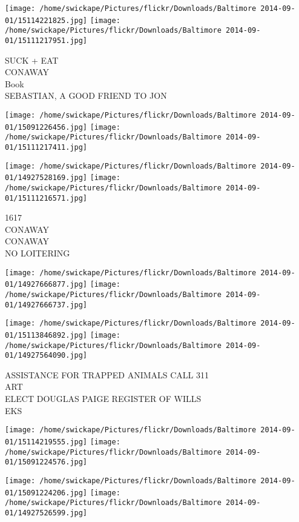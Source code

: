 \documentclass[10pt,letterpaper]{article}
\begin{document}
\texttt{[image: /home/swickape/Pictures/flickr/Downloads/Baltimore 2014-09-01/15114221825.jpg]}
\texttt{[image: /home/swickape/Pictures/flickr/Downloads/Baltimore 2014-09-01/15111217951.jpg]}

SUCK + EAT\\
CONAWAY\\
Book\\
SEBASTIAN, A GOOD FRIEND TO JON\\
\pagebreak

\texttt{[image: /home/swickape/Pictures/flickr/Downloads/Baltimore 2014-09-01/15091226456.jpg]}
\texttt{[image: /home/swickape/Pictures/flickr/Downloads/Baltimore 2014-09-01/15111217411.jpg]}

\texttt{[image: /home/swickape/Pictures/flickr/Downloads/Baltimore 2014-09-01/14927528169.jpg]}
\texttt{[image: /home/swickape/Pictures/flickr/Downloads/Baltimore 2014-09-01/15111216571.jpg]}

1617\\
CONAWAY\\
CONAWAY\\
NO LOITERING\\
\pagebreak

\texttt{[image: /home/swickape/Pictures/flickr/Downloads/Baltimore 2014-09-01/14927666877.jpg]}
\texttt{[image: /home/swickape/Pictures/flickr/Downloads/Baltimore 2014-09-01/14927666737.jpg]}

\texttt{[image: /home/swickape/Pictures/flickr/Downloads/Baltimore 2014-09-01/15113846892.jpg]}
\texttt{[image: /home/swickape/Pictures/flickr/Downloads/Baltimore 2014-09-01/14927564090.jpg]}

ASSISTANCE FOR TRAPPED ANIMALS CALL 311\\
ART\\
ELECT DOUGLAS PAIGE REGISTER OF WILLS\\
EKS\\
\pagebreak

\texttt{[image: /home/swickape/Pictures/flickr/Downloads/Baltimore 2014-09-01/15114219555.jpg]}
\texttt{[image: /home/swickape/Pictures/flickr/Downloads/Baltimore 2014-09-01/15091224576.jpg]}

\texttt{[image: /home/swickape/Pictures/flickr/Downloads/Baltimore 2014-09-01/15091224206.jpg]}
\texttt{[image: /home/swickape/Pictures/flickr/Downloads/Baltimore 2014-09-01/14927526599.jpg]}
\end{document}
